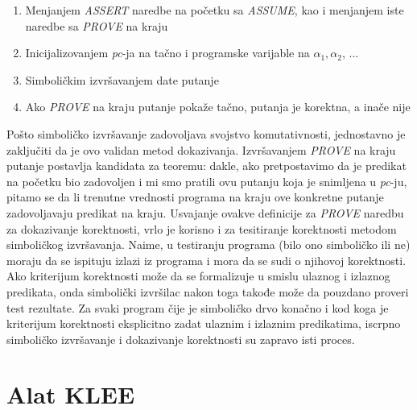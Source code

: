 \documentclass[a4paper]{article}
\begin{document}
{\begin{enumerate}
\item {Menjanjem \textit{ASSERT} naredbe na početku sa \textit{ASSUME}, kao i menjanjem iste naredbe sa \textit{PROVE} na kraju}  
\item{ Inicijalizovanjem \textit{pc}-ja na tačno i programske varijable na $\alpha_1, \alpha_2 $, ... }
\item { Simboličkim izvršavanjem date putanje }
\item {Ako \textit{PROVE} na kraju putanje pokaže tačno, putanja je korektna, a inače nije }
 \end{enumerate}
Pošto simboličko izvršavanje zadovoljava svojstvo komutativnosti, jednostavno je zaključiti da je ovo validan metod dokazivanja. Izvršavanjem \textit{PROVE} na kraju putanje postavlja kandidata za teoremu: dakle, ako pretpostavimo da je predikat na početku bio zadovoljen i mi smo pratili ovu putanju koja je snimljena u \textit{pc}-ju, pitamo se da li trenutne vrednosti programa na kraju ove konkretne putanje zadovoljavaju predikat na kraju. Usvajanje ovakve definicije za \textit{PROVE} naredbu za dokazivanje korektnosti, vrlo je korisno i za tesitiranje korektnosti metodom simboličkog izvršavanja. Naime, u testiranju programa (bilo ono simboličko ili ne) moraju da se ispituju izlazi iz programa i mora da se sudi o njihovoj korektnosti.  Ako kriterijum korektnosti može da se formalizuje u smislu ulaznog i izlaznog predikata, onda simbolički izvršilac nakon toga takođe može da pouzdano proveri test rezultate. Za svaki program čije je simboličko drvo konačno i kod koga je kriterijum korektnosti eksplicitno zadat ulaznim i izlaznim predikatima, iscrpno simboličko izvršavanje i dokazivanje korektnosti su zapravo isti proces.


 
\section{Alat KLEE}
\label{sec:naslov2}

}
\end{document}
